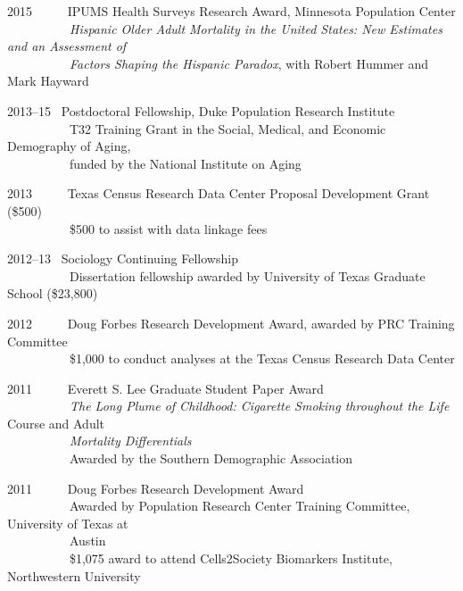 \documentclass[11pt,]{article}
\begin{document}
2015 ~ ~ ~ IPUMS Health Surveys Research Award, Minnesota Population
Center\\
\hspace*{0.333em} ~ ~ ~ ~ ~ ~ \emph{Hispanic Older Adult Mortality in
the United States: New Estimates and an Assessment of}\\
\hspace*{0.333em} ~ ~ ~ ~ ~ ~ \emph{Factors Shaping the Hispanic
Paradox}, with Robert Hummer and Mark Hayward

2013--15 ~Postdoctoral Fellowship, Duke Population Research Institute\\
\hspace*{0.333em} ~ ~ ~ ~ ~ ~ T32 Training Grant in the Social, Medical,
and Economic Demography of Aging,\\
\hspace*{0.333em} ~ ~ ~ ~ ~ ~ funded by the National Institute on Aging

2013 ~ ~ ~ Texas Census Research Data Center Proposal Development Grant
(\$500)\\
\hspace*{0.333em} ~ ~ ~ ~ ~ ~ \$500 to assist with data linkage fees

2012--13 ~Sociology Continuing Fellowship\\
\hspace*{0.333em} ~ ~ ~ ~ ~ ~ Dissertation fellowship awarded by
University of Texas Graduate School (\$23,800)

2012 ~ ~ ~ Doug Forbes Research Development Award, awarded by PRC
Training Committee\\
\hspace*{0.333em} ~ ~ ~ ~ ~ ~ \$1,000 to conduct analyses at the Texas
Census Research Data Center

2011 ~ ~ ~ Everett S. Lee Graduate Student Paper Award\\
\hspace*{0.333em} ~ ~ ~ ~ ~ ~ \emph{The Long Plume of Childhood:
Cigarette Smoking throughout the Life} Course and Adult\\
\hspace*{0.333em} ~ ~ ~ ~ ~ ~ \emph{Mortality Differentials}\\
\hspace*{0.333em} ~ ~ ~ ~ ~ ~ Awarded by the Southern Demographic
Association

2011 ~ ~ ~ Doug Forbes Research Development Award\\
\hspace*{0.333em} ~ ~ ~ ~ ~ ~ Awarded by Population Research Center
Training Committee, University of Texas at\\
\hspace*{0.333em} ~ ~ ~ ~ ~ ~ Austin\\
\hspace*{0.333em} ~ ~ ~ ~ ~ ~ \$1,075 award to attend Cells2Society
Biomarkers Institute, Northwestern University
\end{document}

